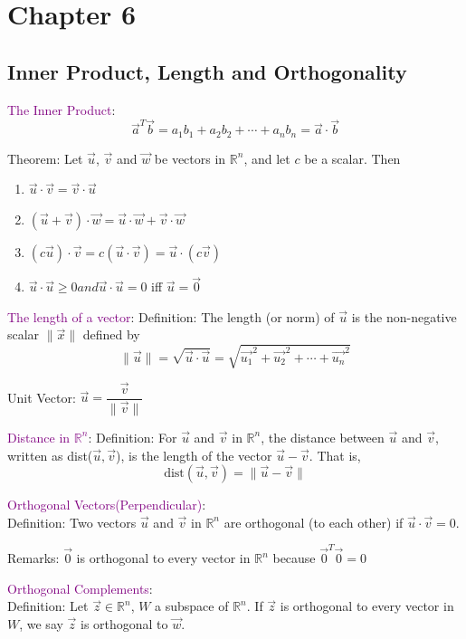 \documentclass[12pt]{article}
\newcommand\norm[1]{\lVert#1\rVert}
\begin{document}
\section{Chapter 6}
\subsection{Inner Product, Length and Orthogonality}
\textcolor{purple}{The Inner Product}:
$$\vec{a}^T \vec{b} = a_1b_1+a_2b_2+\cdots+a_nb_n= \vec{a} \cdot \vec{b}$$

Theorem: Let $\vec{u}$, $\vec{v}$ and $\vec{w}$ be vectors in $\mathbb{R}^n$, and let $c$ be a scalar. Then
\begin{enumerate}
    \item $\vec{u} \cdot \vec{v} = \vec{v} \cdot \vec{u}$
    \item $(\vec{u}+\vec{v}) \cdot \vec{w} = \vec{u} \cdot \vec{w}+\vec{v} \cdot \vec{w}$
    \item $(c\vec{u})\cdot\vec{v}=c(\vec{u} \cdot \vec{v}) = \vec{u} \cdot (c\vec{v})$
    \item $\vec{u} \cdot \vec{u} \geq 0 and \vec{u} \cdot \vec{u} = 0$ iff $\vec{u} = \vec{0}$
\end{enumerate}

\textcolor{purple}{The length of a vector}:
Definition: The length (or norm) of $\vec{u}$ is the non-negative scalar $\norm{\vec{x}}$ defined by $$\norm{\vec{u}} = \sqrt{\vec{u} \cdot \vec{u}} = \sqrt{\vec{u_1}^2+\vec{u_2}^2+\cdots+\vec{u_n}^2}$$


Unit Vector: $\vec{u} = \dfrac{\vec{v}}{\norm{\vec{v}}}$

\textcolor{purple}{Distance in $\mathbb{R}^n$}:
Definition: For $\vec{u}$ and $\vec{v}$ in $\mathbb{R}^n$, the distance between $\vec{u}$ and $\vec{v}$, written as dist($\vec{u}, \vec{v}$), is the length of the vector $\vec{u}-\vec{v}$. That is, $$\text{dist}(\vec{u}, \vec{v}) = \norm{\vec{u} - \vec{v}}$$


\textcolor{purple}{Orthogonal Vectors(Perpendicular)}:\\
Definition: Two vectors $\vec{u}$ and $\vec{v}$ in $\mathbb{R}^n$ are orthogonal (to each other) if $\vec{u}\cdot\vec{v} =0$.

Remarks: $\vec{0}$ is orthogonal to every vector in $\mathbb{R}^n$ because $\vec{0}^T\vec{0} = 0$


\textcolor{purple}{Orthogonal Complements}:\\
Definition: Let $\vec{z} \in \mathbb{R}^n$, $W$ a subspace of $\mathbb{R}^n$. If $\vec{z}$ is orthogonal to every vector in $W$, we say $\vec{z}$ is orthogonal to $\vec{w}$.
\end{document}
